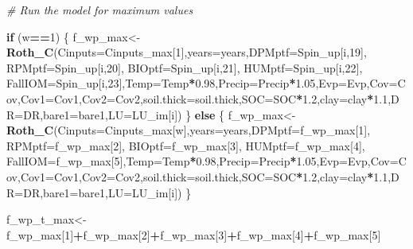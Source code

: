 \documentclass[
  10pt,
  b5paper,
]{book}
\newenvironment{Shaded}{\begin{snugshade}}{\end{snugshade}}
\newcommand{\CommentTok}[1]{\textcolor[rgb]{0.56,0.35,0.01}{\textit{#1}}}
\newcommand{\ControlFlowTok}[1]{\textcolor[rgb]{0.13,0.29,0.53}{\textbf{#1}}}
\newcommand{\DataTypeTok}[1]{\textcolor[rgb]{0.13,0.29,0.53}{#1}}
\newcommand{\DecValTok}[1]{\textcolor[rgb]{0.00,0.00,0.81}{#1}}
\newcommand{\FloatTok}[1]{\textcolor[rgb]{0.00,0.00,0.81}{#1}}
\newcommand{\KeywordTok}[1]{\textcolor[rgb]{0.13,0.29,0.53}{\textbf{#1}}}
\newcommand{\NormalTok}[1]{#1}
\newcommand{\OperatorTok}[1]{\textcolor[rgb]{0.81,0.36,0.00}{\textbf{#1}}}
\begin{document}
\begin{Shaded}
\begin{Highlighting}[]
{\CommentTok{# Run the model for maximum values}

\ControlFlowTok{if}\NormalTok{ (w}\OperatorTok{==}\DecValTok{1}\NormalTok{) \{}
\NormalTok{f_wp_max<-}\KeywordTok{Roth_C}\NormalTok{(}\DataTypeTok{Cinputs=}\NormalTok{Cinputs_max[}\DecValTok{1}\NormalTok{],}\DataTypeTok{years=}\NormalTok{years,}\DataTypeTok{DPMptf=}\NormalTok{Spin_up[i,}\DecValTok{19}\NormalTok{], }\DataTypeTok{RPMptf=}\NormalTok{Spin_up[i,}\DecValTok{20}\NormalTok{], }\DataTypeTok{BIOptf=}\NormalTok{Spin_up[i,}\DecValTok{21}\NormalTok{], }\DataTypeTok{HUMptf=}\NormalTok{Spin_up[i,}\DecValTok{22}\NormalTok{], }\DataTypeTok{FallIOM=}\NormalTok{Spin_up[i,}\DecValTok{23}\NormalTok{],}\DataTypeTok{Temp=}\NormalTok{Temp}\OperatorTok{*}\FloatTok{0.98}\NormalTok{,}\DataTypeTok{Precip=}\NormalTok{Precip}\OperatorTok{*}\FloatTok{1.05}\NormalTok{,}\DataTypeTok{Evp=}\NormalTok{Evp,}\DataTypeTok{Cov=}\NormalTok{Cov,}\DataTypeTok{Cov1=}\NormalTok{Cov1,}\DataTypeTok{Cov2=}\NormalTok{Cov2,}\DataTypeTok{soil.thick=}\NormalTok{soil.thick,}\DataTypeTok{SOC=}\NormalTok{SOC}\OperatorTok{*}\FloatTok{1.2}\NormalTok{,}\DataTypeTok{clay=}\NormalTok{clay}\OperatorTok{*}\FloatTok{1.1}\NormalTok{,}\DataTypeTok{DR=}\NormalTok{DR,}\DataTypeTok{bare1=}\NormalTok{bare1,}\DataTypeTok{LU=}\NormalTok{LU_im[i])}
\NormalTok{\} }\ControlFlowTok{else}\NormalTok{ \{}
\NormalTok{f_wp_max<-}\KeywordTok{Roth_C}\NormalTok{(}\DataTypeTok{Cinputs=}\NormalTok{Cinputs_max[w],}\DataTypeTok{years=}\NormalTok{years,}\DataTypeTok{DPMptf=}\NormalTok{f_wp_max[}\DecValTok{1}\NormalTok{], }\DataTypeTok{RPMptf=}\NormalTok{f_wp_max[}\DecValTok{2}\NormalTok{], }\DataTypeTok{BIOptf=}\NormalTok{f_wp_max[}\DecValTok{3}\NormalTok{], }\DataTypeTok{HUMptf=}\NormalTok{f_wp_max[}\DecValTok{4}\NormalTok{], }\DataTypeTok{FallIOM=}\NormalTok{f_wp_max[}\DecValTok{5}\NormalTok{],}\DataTypeTok{Temp=}\NormalTok{Temp}\OperatorTok{*}\FloatTok{0.98}\NormalTok{,}\DataTypeTok{Precip=}\NormalTok{Precip}\OperatorTok{*}\FloatTok{1.05}\NormalTok{,}\DataTypeTok{Evp=}\NormalTok{Evp,}\DataTypeTok{Cov=}\NormalTok{Cov,}\DataTypeTok{Cov1=}\NormalTok{Cov1,}\DataTypeTok{Cov2=}\NormalTok{Cov2,}\DataTypeTok{soil.thick=}\NormalTok{soil.thick,}\DataTypeTok{SOC=}\NormalTok{SOC}\OperatorTok{*}\FloatTok{1.2}\NormalTok{,}\DataTypeTok{clay=}\NormalTok{clay}\OperatorTok{*}\FloatTok{1.1}\NormalTok{,}\DataTypeTok{DR=}\NormalTok{DR,}\DataTypeTok{bare1=}\NormalTok{bare1,}\DataTypeTok{LU=}\NormalTok{LU_im[i])}
\NormalTok{\}}

\NormalTok{f_wp_t_max<-f_wp_max[}\DecValTok{1}\NormalTok{]}\OperatorTok{+}\NormalTok{f_wp_max[}\DecValTok{2}\NormalTok{]}\OperatorTok{+}\NormalTok{f_wp_max[}\DecValTok{3}\NormalTok{]}\OperatorTok{+}\NormalTok{f_wp_max[}\DecValTok{4}\NormalTok{]}\OperatorTok{+}\NormalTok{f_wp_max[}\DecValTok{5}\NormalTok{]}

}
\end{Highlighting}
\end{Shaded}
\end{document}
